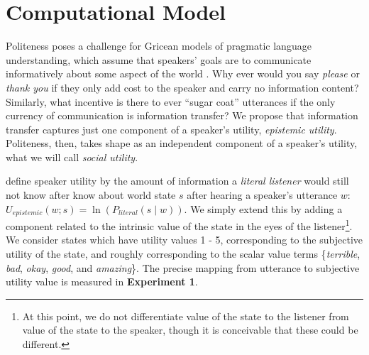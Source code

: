 \documentclass[10pt,letterpaper]{article}
\begin{document}
%


\section{Computational Model}

Politeness poses a challenge for Gricean models of pragmatic language understanding, which assume that speakers' goals are to communicate informatively about some aspect of the world \cite{Frank2012, Goodman2013}. 
Why ever would you say \emph{please} or \emph{thank you} if they only add cost to the speaker and carry no information content?
Similarly, what incentive is there to ever ``sugar coat'' utterances if the only currency of communication is information transfer? 
We propose that information transfer captures just one component of a speaker's utility, \emph{epistemic utility}.
Politeness, then, takes shape as an independent component of a speaker's utility, what we will call \emph{social utility}. 

 define speaker utility by the amount of information a \emph{literal listener} would still not know after know about world state $s$ after hearing a speaker's utterance $w$: 
$U_{epistemic}(w; s) = \ln(P_{literal}(s \mid w)) $.
We simply extend this by adding a component related to the intrinsic value of the state in the eyes of the listener\footnote{At this point, we do not differentiate value of the state to the listener from value of the state to the speaker, though it is conceivable that these could be different.}.
We consider states which have utility values 1 - 5, corresponding to the subjective utility of the state, and roughly corresponding to the scalar value terms \{\emph{terrible}, \emph{bad}, \emph{okay}, \emph{good}, and \emph{amazing}\}.
The precise mapping from utterance to subjective utility value is measured in \textbf{Experiment 1}.
\end{document}
